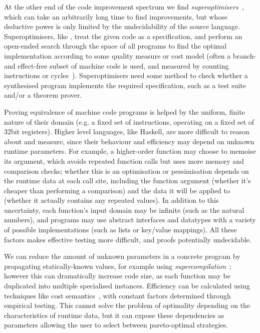 At the other end of the code improvement spectrum we find
\emph{superoptimisers}~\cite{}, which can take an
arbitrarily long time to find improvements, but whose deductive power is only
limited by the undecidability of the source language. Superoptimisers, like ,
treat the given code as a specification, and perform an open-ended search
through the space of all programs to find the optimal implementation according
to some quality measure or cost model (often a branch- and effect-free subset of
machine code is used, and measured by counting instructions or
cycles~\cite{massalin1987superoptimizer}). Superoptimisers need some method to
check whether a synthesised program implements the required specification, such
as a test suite and/or a theorem prover.

Proving equivalence of machine code programs is helped by the uniform, finite
nature of their domain (e.g. a fixed set of instructions, operating on a fixed
set of 32bit registers). Higher level languages, like Haskell, are more
difficult to reason about and measure, since their behaviour and efficiency may
depend on unknown runtime parameters. For example, a higher-order function may
choose to memoise its argument, which avoids repeated function calls but uses
more memory and comparison checks; whether this is an optimisation or
pessimisation depends on the runtime data at each call site, including the
function argument (whether it's cheaper than performing a comparison) and the
data it will be applied to (whether it actually contains any repeated values).
In addition to this uncertainty, each function's input domain may be infinite
(such as the natural numbers), and programs may use abstract interfaces and
datatypes with a variety of possible implementations (such as lists or key/value
mappings). All these factors makes effective testing more difficult, and proofs
potentially undecidable.

We can reduce the amount of unknown parameters in a concrete program by
propagating statically-known values, for example using
\emph{supercompilation}~\cite{Turchin:1986:CS:5956.5957}; however this can
dramatically increase code size, as each function may be duplicated into
multiple specialised instances. Efficiency can be calculated
using techniques like cost semantics~\cite{danner2015denotational}, with
constant factors determined through empirical testing. This cannot solve the
problem of optimality depending on the characteristics of runtime data, but it
can expose these dependencies as parameters allowing the user to select
between pareto-optimal strategies.

